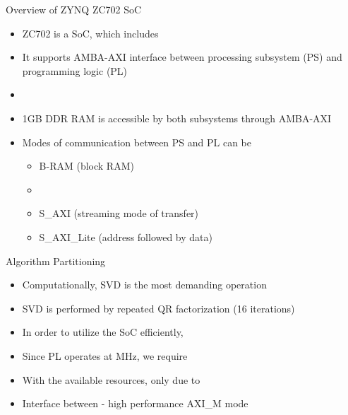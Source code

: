 \documentclass[11pt]{beamer}
\begin{document}
\begin{frame}{Overview of ZYNQ ZC702 SoC}
	\begin{itemize}
		\item ZC702 is a SoC, which includes 
		\item It supports AMBA-AXI interface between processing subsystem (PS) and programming logic (PL)
		\item {}
		\item 1GB DDR RAM is accessible by both subsystems through AMBA-AXI
		\item Modes of communication between PS and PL can be
		\begin{itemize}
			\item B-RAM (block RAM)
			\item {}
			\item S\_AXI (streaming mode of transfer)
			\item S\_AXI\_Lite (address followed by data)
		\end{itemize}
	\end{itemize}
\end{frame}

\begin{frame}{Algorithm Partitioning}
	\begin{itemize}
		\item Computationally, SVD is the most demanding operation
		\item SVD is performed by repeated QR factorization (16 iterations)
		\item In order to utilize the SoC efficiently, 
		\item Since PL operates at  MHz, we require 
		\item With the available resources, only  due to 
		\item Interface between  - high performance AXI\_M mode
	\end{itemize}
\end{frame}
\end{document}

